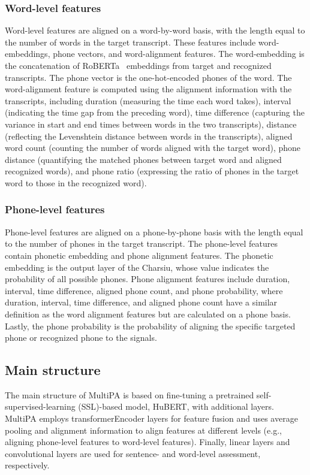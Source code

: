 \documentclass{Interspeech2024}
\begin{document}
\subsubsection{Word-level features}
Word-level features are aligned on a word-by-word basis, with the length equal to the number of words in the target transcript. These features include word-embeddings, phone vectors, and word-alignment features. The word-embedding is the concatenation of RoBERTa~\cite{liu2019roberta} embeddings from target and recognized transcripts. The phone vector is the one-hot-encoded phones of the word. The word-alignment feature is computed using the alignment information with the transcripts, including duration (measuring the time each word takes), interval (indicating the time gap from the preceding word), time difference (capturing the variance in start and end times between words in the two transcripts), distance (reflecting the Levenshtein distance between words in the transcripts), aligned word count (counting the number of words aligned with the target word), phone distance (quantifying the matched phones between target word and aligned recognized words), and phone ratio (expressing the ratio of phones in the target word to those in the recognized word). 


\subsubsection{Phone-level features}
Phone-level features are aligned on a phone-by-phone basis with the length equal to the number of phones in the target transcript. The phone-level features contain phonetic embedding and phone alignment features. The phonetic embedding is the output layer of the Charsiu, whose value indicates the probability of all possible phones. Phone alignment features include duration, interval, time difference, aligned phone count, and phone probability, where duration, interval, time difference, and aligned phone count have a similar definition as the word alignment features but are calculated on a phone basis. Lastly, the phone probability is the probability of aligning the specific targeted phone or recognized phone to the signals. 

\subsection{Main structure}
The main structure of MultiPA is based on fine-tuning a pretrained self-supervised-learning (SSL)-based model, HuBERT, with additional layers. MultiPA employs transformerEncoder layers for feature fusion and uses average pooling and alignment information to align features at different levels (e.g., aligning phone-level features to word-level features). Finally, linear layers and convolutional layers are used for sentence- and word-level assessment, respectively. 
\end{document}
